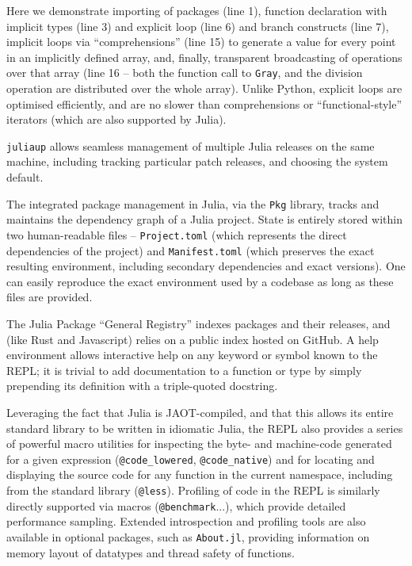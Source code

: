 \documentclass{webofc}
\begin{document}
Here we demonstrate importing of packages (line 1), function declaration with
implicit types (line 3) and explicit loop (line 6) and branch constructs (line
7), implicit loops via ``comprehensions'' (line 15) to generate a  value for
every point in an implicitly defined array, and, finally, transparent
broadcasting of operations over that array (line 16 -- both the function call to
\texttt{Gray}, and the division operation are distributed over the whole array). Unlike
Python, explicit loops are optimised efficiently, and are no slower than
comprehensions or ``functional-style'' iterators (which are also supported by
Julia).


\texttt{juliaup} allows seamless management of multiple Julia releases on the same
machine, including tracking particular patch releases, and choosing the system
default.

The integrated package management in Julia, via the \texttt{Pkg} library, tracks and
maintains the dependency graph of a Julia project. State is entirely stored
within two human-readable files -- \texttt{Project.toml} (which represents the direct
dependencies of the project) and \texttt{Manifest.toml} (which preserves the exact
resulting environment, including secondary dependencies and exact versions).
One can easily reproduce the exact environment used by
a codebase as long as these files are provided.

The Julia Package ``General Registry'' indexes packages and their releases, and
(like Rust and Javascript) relies on a public index
hosted on GitHub. A help environment allows interactive help on any keyword
or symbol known to the REPL; it is trivial to add documentation to a function or
type by simply prepending its definition with a triple-quoted docstring.

Leveraging the fact that Julia is JAOT-compiled, and that this allows its entire
standard library to be written in idiomatic Julia, the REPL also provides a
series of powerful macro utilities for inspecting the byte- and machine-code
generated for a given expression (\verb$@code_lowered$, \verb$@code_native$) and
for locating and displaying the source code for any function in the current
namespace, including from the standard library (\verb$@less$). Profiling of code in the REPL is similarly directly
supported via macros (\verb$@benchmark$...), which provide detailed performance
sampling. Extended
introspection and profiling tools are also available in optional packages, such
as \texttt{About.jl}, providing information on memory layout of
datatypes and thread safety of functions.
\end{document}
